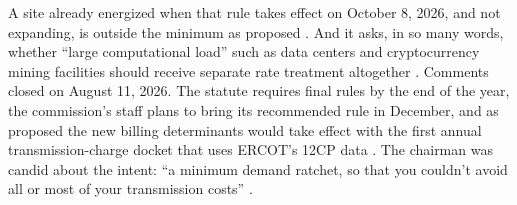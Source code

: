 A site already energized when that rule takes effect on October 8, 2026, and not expanding, is outside the minimum as proposed \autocite{puct2026prop58000,puct2026order58481}. %
And it asks, in so many words, whether ``large computational load'' such as data centers and cryptocurrency mining facilities should receive separate rate treatment altogether \autocite{puct2026prop58000}. %
Comments closed on August 11, 2026. The statute requires final rules by the end of the year, the commission's staff plans to bring its recommended rule in December, and as proposed the new billing determinants would take effect with the first annual transmission-charge docket that uses ERCOT's 12CP data \autocite{puct2026sb6roadmap}. %
The chairman was candid about the intent: ``a minimum demand ratchet, so that you couldn't avoid all or most of your transmission costs'' \autocite{tep2026gleeson}. %

